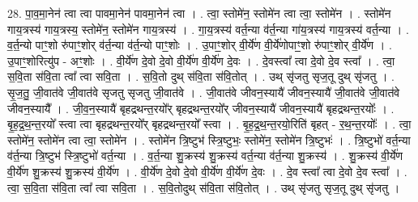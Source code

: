 \documentclass[17pt]{extarticle}
\begin{document}
28. पा॒व॒मा॒नेन॑ त्वा त्वा पावमा॒नेन॑ पावमा॒नेन॑ त्वा । . त्वा॒ स्तोमे॑न॒ स्तोमे॑न त्वा त्वा॒ स्तोमे॑न । . स्तोमे॑न गाय॒त्रस्य॑ गाय॒त्रस्य॒ स्तोमे॑न॒ स्तोमे॑न गाय॒त्रस्य॑ । . गा॒य॒त्रस्य॑ वर्त॒न्या व॑र्त॒न्या गा॑य॒त्रस्य॑ गाय॒त्रस्य॑ वर्त॒न्या । . व॒र्त॒न्यो पाꣳ॒॒शो रु॑पाꣳ॒॒शोर् व॑र्त॒न्या व॑र्त॒न्यो पाꣳ॒॒शोः । . उ॒पाꣳ॒॒शोर् वी॒र्ये॑ण वी॒र्ये॑णोपाꣳ॒॒शो रु॑पाꣳ॒॒शोर् वी॒र्ये॑ण । . उ॒पाꣳ॒॒शोरित्यु॑प - अꣳ॒॒शोः । . वी॒र्ये॑ण दे॒वो दे॒वो वी॒र्ये॑ण वी॒र्ये॑ण दे॒वः । . दे॒वस्त्वा᳚ त्वा दे॒वो दे॒व स्त्वा᳚ । . त्वा॒ स॒वि॒ता स॑वि॒ता त्वा᳚ त्वा सवि॒ता । . स॒वि॒तो दुथ् स॑वि॒ता स॑वि॒तोत् । . उथ् सृ॑जतु सृज॒तू दुथ् सृ॑जतु । . सृ॒ज॒तु॒ जी॒वात॑वे जी॒वात॑वे सृजतु सृजतु जी॒वात॑वे । . जी॒वात॑वे जीवन॒स्यायै॑ जीवन॒स्यायै॑ जी॒वात॑वे जी॒वात॑वे जीवन॒स्यायै᳚ । . जी॒व॒न॒स्यायै॑ बृहद्रथन्त॒रयो᳚र् बृहद्रथन्त॒रयो᳚र् जीवन॒स्यायै॑ जीवन॒स्यायै॑ बृहद्रथन्त॒रयोः᳚ । . बृ॒ह॒द्र॒थ॒न्त॒रयो᳚ स्त्वा त्वा बृहद्रथन्त॒रयो᳚र् बृहद्रथन्त॒रयो᳚ स्त्वा । . बृ॒ह॒द्र॒थ॒न्त॒रयो॒रिति॑ बृहत् - र॒थ॒न्त॒रयोः᳚ । . त्वा॒ स्तोमे॑न॒ स्तोमे॑न त्वा त्वा॒ स्तोमे॑न । . स्तोमे॑न त्रि॒ष्टुभ॑ स्त्रि॒ष्टुभः॒ स्तोमे॑न॒ स्तोमे॑न त्रि॒ष्टुभः॑ । . त्रि॒ष्टुभो॑ वर्त॒न्या व॑र्त॒न्या त्रि॒ष्टुभ॑ स्त्रि॒ष्टुभो॑ वर्त॒न्या । . व॒र्त॒न्या शु॒क्रस्य॑ शु॒क्रस्य॑ वर्त॒न्या व॑र्त॒न्या शु॒क्रस्य॑ । . शु॒क्रस्य॑ वी॒र्ये॑ण वी॒र्ये॑ण शु॒क्रस्य॑ शु॒क्रस्य॑ वी॒र्ये॑ण । . वी॒र्ये॑ण दे॒वो दे॒वो वी॒र्ये॑ण वी॒र्ये॑ण दे॒वः । . दे॒व स्त्वा᳚ त्वा दे॒वो दे॒व स्त्वा᳚ । . त्वा॒ स॒वि॒ता स॑वि॒ता त्वा᳚ त्वा सवि॒ता । . स॒वि॒तोदुथ् स॑वि॒ता स॑वि॒तोत् । . उथ् सृ॑जतु सृज॒तू दुथ् सृ॑जतु । \newline
\end{document}

